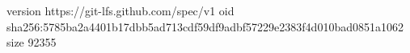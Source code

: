 version https://git-lfs.github.com/spec/v1
oid sha256:5785ba2a4401b17dbb5ad713cdf59df9adbf57229e2383f4d010bad0851a1062
size 92355
